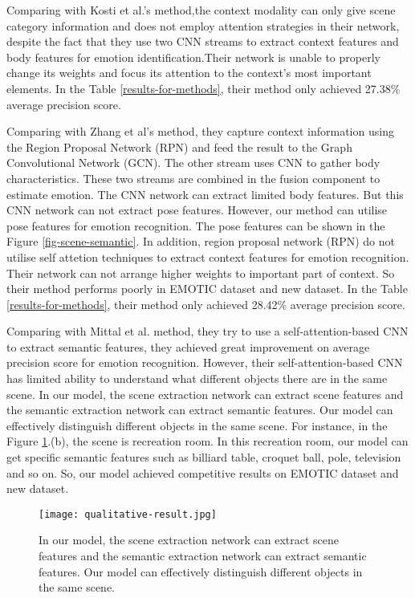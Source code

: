 \documentclass[conference]{IEEEtran}
\begin{document}
Comparing with Kosti et al.\cite{ref-22}'s method,the context modality can only give scene category information and does not employ attention strategies in their network, despite the fact that they use two CNN streams to extract context features and body features for emotion identification.Their network is unable to properly change its weights and focus its attention to the context's most important elements. In the Table \ref{results-for-methods},  their method only achieved 27.38\% average precision score. 

Comparing with Zhang et al's \cite{ref-42} method, they capture context information using the Region Proposal Network (RPN) and feed the result  to the Graph Convolutional Network (GCN). The other stream uses CNN to gather body characteristics. These two streams are combined in the fusion component to estimate emotion. The CNN network can extract limited body features. But this CNN network can not extract pose features. However, our method can utilise pose features for emotion recognition. The pose features can be shown  in the Figure \ref{fig-scene-semantic}. In addition, region proposal network (RPN) do not utilise self attetion techniques to extract context features for emotion recognition. Their network can not arrange higher weights to important part of context. So their method performs poorly in EMOTIC dataset and new dataset. In the Table \ref{results-for-methods},  their method only achieved 28.42\% average precision score. 

Comparing with Mittal et al. \cite{ref-21} method, they try to use a self-attention-based CNN to extract semantic features, they achieved great improvement on average precision score for emotion recognition. However, their self-attention-based CNN has limited ability to understand what different objects there are in the same scene. In our model, the scene extraction network can extract scene features and the semantic extraction network can extract semantic features. Our model can effectively distinguish different objects in the same scene. For instance, in the Figure \ref{fig-Qualitative-Results}.(b), the scene is recreation room. In this recreation room, our model can get specific semantic features such as billiard table, croquet ball, pole, television and so on. So, our model achieved competitive results on EMOTIC dataset and new dataset. 
\begin{figure}[htbp]
\centering
  \texttt{[image: qualitative-result.jpg]}
  \caption{In our model, the scene extraction network can extract scene features and the semantic extraction network can extract semantic features. Our model can effectively distinguish different objects in the same scene.}
  \label{fig-Qualitative-Results}
\end{figure}
\end{document}
